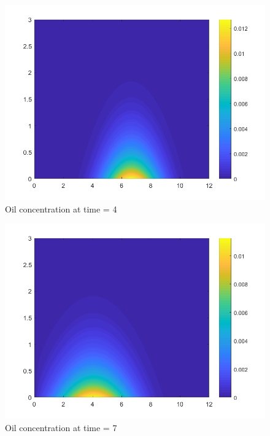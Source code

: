 \documentclass[12pt]{article}
\begin{document}
\begin{figure}[bht]
\begin{center}
\includegraphics[width=1\textwidth]{t4}
\end{center}
\caption{Oil concentration at time = 4} \label{fig::MyFigure}
\end{figure}

\begin{figure}[bht]
\begin{center}
\includegraphics[width=1\textwidth]{t7}
\end{center}
\caption{Oil concentration at time = 7} \label{fig::MyFigure}
\end{figure}
\end{document}

